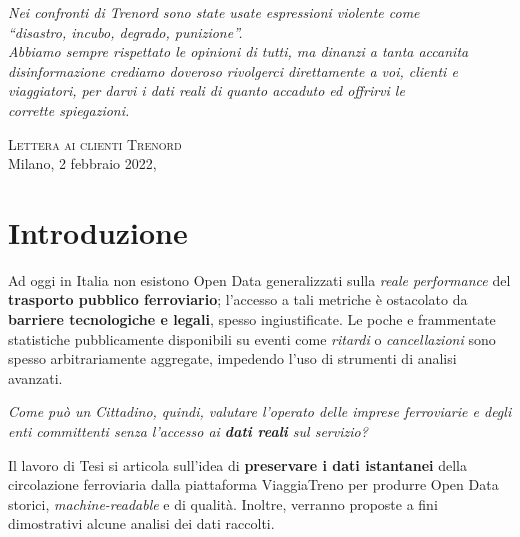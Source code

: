 \documentclass[12pt,a4paper,italian]{report}
\begin{document}

\frontespizio \beforepreface


\hfill
\begin{minipage}{8.5cm}
    \setlength\epigraphwidth{\linewidth} \epigraph{%
        \large\sl Nei confronti di Trenord
        sono state usate espressioni violente come \\
        ``disastro, incubo, degrado, punizione''.\\
        \bigskip Abbiamo sempre rispettato le opinioni di tutti, ma
        dinanzi a tanta accanita disinformazione crediamo doveroso
        rivolgerci direttamente a voi, clienti e viaggiatori, per
        darvi i \textit{dati reali} di quanto accaduto ed offrirvi le \\
        \textit{corrette spiegazioni}.}{%
        \textrm{\textsc{Lettera ai clienti Trenord}\\
            Milano, 2 febbraio 2022,~\cite{TrenordLettera}} }
\end{minipage}
	
	
\afterpreface
	
\listoftodos
	
\chapter{Introduzione}

Ad oggi in Italia non esistono Open Data generalizzati sulla
\textit{reale performance} del \textbf{trasporto pubblico
    ferroviario}; l'accesso a tali metriche è ostacolato da
\textbf{barriere tecnologiche e legali}, spesso ingiustificate.  Le
poche e frammentate statistiche pubblicamente disponibili su eventi
come \textit{ritardi} o \textit{cancellazioni} sono spesso
arbitrariamente aggregate, impedendo l'uso di strumenti di analisi
avanzati.

\textit{Come può un Cittadino, quindi, valutare l'operato delle
    imprese ferroviarie e degli enti committenti senza l'accesso ai
    \textbf{dati reali} sul servizio?}

Il lavoro di Tesi si articola sull’idea di \textbf{preservare i dati
    istantanei} della circolazione ferroviaria dalla piattaforma
ViaggiaTreno per produrre Open Data storici, \textit{machine-readable}
e di qualità.  Inoltre, verranno proposte a fini dimostrativi alcune
analisi dei dati raccolti.
\end{document}
